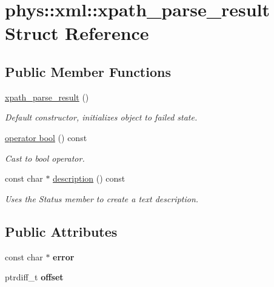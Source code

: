 \hypertarget{structphys_1_1xml_1_1xpath__parse__result}{
\section{phys::xml::xpath\_\-parse\_\-result Struct Reference}
\label{d3/d82/structphys_1_1xml_1_1xpath__parse__result}
}
\subsection*{Public Member Functions}
\begin{DoxyCompactItemize}
\item 
\hypertarget{structphys_1_1xml_1_1xpath__parse__result_a8d76f84208d53049832837761bed2aa2}{
\hyperlink{structphys_1_1xml_1_1xpath__parse__result_a8d76f84208d53049832837761bed2aa2}{xpath\_\-parse\_\-result} ()}
\label{d3/d82/structphys_1_1xml_1_1xpath__parse__result_a8d76f84208d53049832837761bed2aa2}

\begin{DoxyCompactList}\small\item\em Default constructor, initializes object to failed state. \item\end{DoxyCompactList}\item 
\hyperlink{structphys_1_1xml_1_1xpath__parse__result_a6dcc7705327a53c40d27951f1fa135e8}{operator bool} () const 
\begin{DoxyCompactList}\small\item\em Cast to bool operator. \item\end{DoxyCompactList}\item 
const char $\ast$ \hyperlink{structphys_1_1xml_1_1xpath__parse__result_ad4a6c1b6f5b15a51f363eb1ba80ba328}{description} () const 
\begin{DoxyCompactList}\small\item\em Uses the Status member to create a text description. \item\end{DoxyCompactList}\end{DoxyCompactItemize}
\subsection*{Public Attributes}
\begin{DoxyCompactItemize}
\item 
\hypertarget{structphys_1_1xml_1_1xpath__parse__result_aa22bdd4bda9b88bf8fabfe0a6da3f0f8}{
const char $\ast$ {\bfseries error}}
\label{d3/d82/structphys_1_1xml_1_1xpath__parse__result_aa22bdd4bda9b88bf8fabfe0a6da3f0f8}

\item 
\hypertarget{structphys_1_1xml_1_1xpath__parse__result_a56213a26c0e24a7f2d1212ff6095bc51}{
ptrdiff\_\-t {\bfseries offset}}
\label{d3/d82/structphys_1_1xml_1_1xpath__parse__result_a56213a26c0e24a7f2d1212ff6095bc51}

\end{DoxyCompactItemize}


